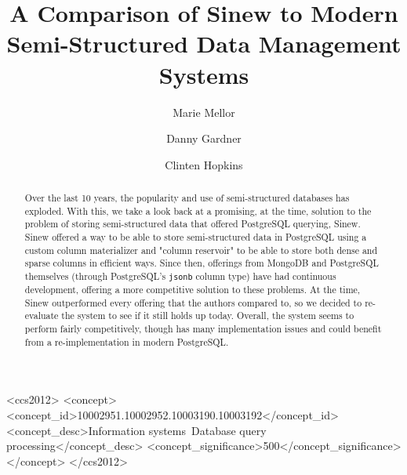 \documentclass[sigconf]{acmart}
\begin{document}
\title{A Comparison of Sinew to Modern Semi-Structured Data Management Systems}

\author{Marie Mellor}

\author{Danny Gardner}

\author{Clinten Hopkins}


\begin{CCSXML}
<ccs2012>
   <concept>
       <concept_id>10002951.10002952.10003190.10003192</concept_id>
       <concept_desc>Information systems~Database query processing</concept_desc>
       <concept_significance>500</concept_significance>
       </concept>
 </ccs2012>
\end{CCSXML}


\begin{abstract}
    Over the last 10 years, the popularity and use of semi-structured databases has exploded. With this, we take a look back at a promising, at the time, solution to the problem of storing semi-structured data that offered PostgreSQL querying, Sinew. Sinew offered a way to be able to store semi-structured data in PostgreSQL using a custom column materializer and "column reservoir" to be able to store both dense and sparse columns in efficient ways. Since then, offerings from MongoDB and PostgreSQL themselves (through PostgreSQL's \texttt{jsonb} column type) have had continuous development, offering a more competitive solution to these problems. At the time, Sinew outperformed every offering that the authors compared to, so we decided to re-evaluate the system to see if it still holds up today. Overall, the system seems to perform fairly competitively, though has many implementation issues and could benefit from a re-implementation in modern PostgreSQL. 
\end{abstract}
\end{document}
